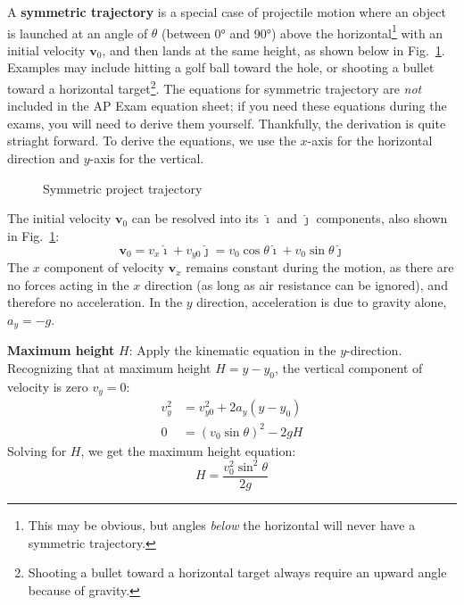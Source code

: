 \documentclass{../../../oss-handout}
\newcommand{\mb}[1]{\mathbf{#1}}
\newcommand{\iii}{\bm{\hat{\imath}}}
\newcommand{\jjj}{\bm{\hat{\jmath}}}
\begin{document}
A \textbf{symmetric trajectory} is a special case of projectile motion where an
object is launched at an angle of $\theta$ (between \ang{0} and \ang{90}) above
the horizontal\footnote{This may be obvious, but angles \emph{below} the 
  horizontal will never have a symmetric trajectory.} with an initial velocity
$\mb{v}_0$, and then lands at the same height, as shown below in Fig.~\ref{sym}.
Examples may include hitting a golf ball toward the hole, or shooting a bullet
toward a horizontal target\footnote{Shooting a bullet toward a horizontal
  target always require an upward angle because of gravity.}. The equations for
symmetric trajectory are \emph{not} included in the AP Exam equation sheet; if
you need these equations during the exams, you will need to derive them
yourself. Thankfully, the derivation is quite striaght forward. To derive the
equations, we use the $x$-axis for the horizontal direction and $y$-axis for
the vertical.
\begin{figure}[ht]
  \begin{center}
  \end{center}
  \vspace{-.2in}
  \caption{Symmetric project trajectory}
  \label{sym}
\end{figure}

The initial velocity $\mb{v}_0$ can be resolved into its $\iii$ and $\jjj$
components, also shown in Fig.~\ref{sym}:
\begin{equation}
  \mb{v}_0
  =v_x\iii+v_{y0}\jjj
  =v_0\cos\theta\iii + v_0\sin\theta\jjj
\end{equation}
The $x$ component of velocity $\mb{v}_x$ remains constant during the motion, as
there are no forces acting in the $x$ direction (as long as air resistance can
be ignored), and therefore no acceleration. In the $y$ direction, acceleration
is due to gravity alone, $a_y=-g$.

\textbf{Maximum height} $H$: Apply the kinematic equation in the $y$-direction.
Recognizing that at maximum height $H=y-y_0$, the vertical component of
velocity is zero $v_y=0$:
\begin{align*}
  v_y^2 &= v_{y0}^2 + 2a_y(y-y_0)\\
  0  &= (v_0\sin\theta)^2-2gH
\end{align*}
Solving for $H$, we get the maximum height equation:
\begin{equation}
  \boxed{H=\frac{v_0^2\sin^2\theta}{2g}}
\end{equation}
\end{document}
